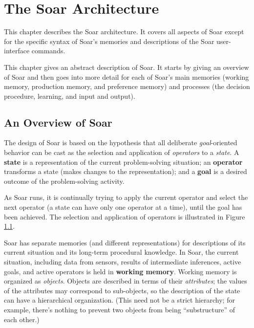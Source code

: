 \chapter{The Soar Architecture}
\label{ARCH}

This chapter describes the Soar architecture.  It covers all aspects of Soar except for the specific syntax of Soar's memories and descriptions of the Soar user-interface commands.

This chapter gives an abstract description of Soar.  It starts by giving an overview of Soar and then goes into more detail for each of Soar's main memories (working memory, production memory, and preference memory) and processes (the decision procedure, learning, and input and output).

\section{An Overview of Soar}
\label{ARCH-overview}

The design of Soar is based on the hypothesis that all deliberate \textit{goal}-oriented behavior can be cast as the selection and application of \textit{operators} to a \textit{state}. A \textbf{state} is a representation of the current problem-solving situation; an \textbf{operator} transforms a state (makes changes to the representation); and a \textbf{goal} is a desired outcome of the problem-solving activity.

As Soar runs, it is continually trying to apply the current operator and select the next operator (a state can have only one operator at a time), until the goal has been achieved. The selection and application of operators is illustrated in Figure \ref{fig:select-apply}. 

\begin{figure}
	\label{fig:select-apply}
\end{figure}

Soar has separate memories (and different representations) for descriptions of its current situation and its long-term procedural knowledge. In Soar, the current situation, including data from sensors, results of intermediate inferences, active goals, and active operators is held in \textbf{working memory}.  Working memory is organized as \emph{objects}. Objects are described in terms of their \emph{attributes}; the values of the attributes may correspond to sub-objects, so the description of the state can have a hierarchical organization. (This need not be a strict hierarchy; for example, there's nothing to prevent two objects from being ``substructure'' of each other.)

